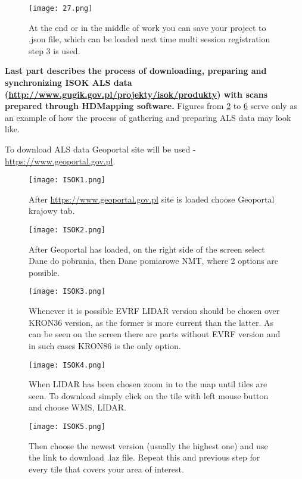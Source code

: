 \begin{figure}[H]
	\centering
	\texttt{[image: 27.png]}
	\caption{At the end or in the middle of work you can save your project to .json file, which can be loaded next time multi session registration step 3 is used.}
	\label{fig:33}
\end{figure}
\pagebreak
\textbf{Last part describes the process of downloading, preparing and synchronizing ISOK ALS data (\url{http://www.gugik.gov.pl/projekty/isok/produkty}) with scans prepared through HDMapping software.}
Figures from \ref{fig:34} to \ref{fig:38} serve only as an example of how the process of gathering and preparing ALS data may look like.

To download ALS data Geoportal site will be used - \url{https://www.geoportal.gov.pl}.

\begin{figure}[H]
	\centering
	\texttt{[image: ISOK1.png]}
	\caption{After \url{https://www.geoportal.gov.pl} site is loaded choose Geoportal krajowy tab.}
	\label{fig:34}
\end{figure}

\begin{figure}[H]
	\centering
	\texttt{[image: ISOK2.png]}
	\caption{After Geoportal has loaded, on the right side of the screen select Dane do pobrania, then Dane pomiarowe NMT, where 2 options are possible.}
	\label{fig:35}
\end{figure}

\begin{figure}[H]
	\centering
	\texttt{[image: ISOK3.png]}
	\caption{Whenever it is possible EVRF LIDAR version should be chosen over KRON36 version, as the former is more current than the latter. As can be seen on the screen there are parts without EVRF version and in such cases KRON86 is the only option.}
	\label{fig:36}
\end{figure}

\begin{figure}[H]
	\centering
	\texttt{[image: ISOK4.png]}
	\caption{When LIDAR has been chosen zoom in to the map until tiles are seen. To download simply click on the tile with left mouse button and choose WMS, LIDAR.}
	\label{fig:37}
\end{figure}

\begin{figure}[H]
	\centering
	\texttt{[image: ISOK5.png]}
	\caption{Then choose the newest version (usually the highest one) and use the link to download .laz file. Repeat this and previous step for every tile that covers your area of interest.}
	\label{fig:38}
\end{figure}

